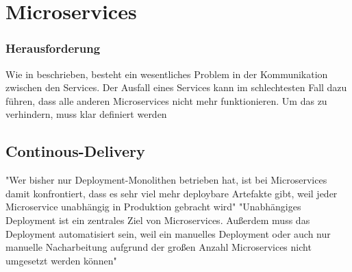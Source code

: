 \chapter{Microservices}
\label{chap:Microservices}


\subsection{Herausforderung}
Wie in \cite[S. 25]{EWolff2016:Microservices} beschrieben, besteht ein wesentliches Problem in der Kommunikation zwischen den Services. Der Ausfall eines Services kann im schlechtesten Fall dazu führen, dass alle anderen Microservices nicht mehr funktionieren. Um das zu verhindern, muss klar definiert werden


\section{Continous-Delivery}
\label{sec:ContinousDelivery}
"Wer bisher nur Deployment-Monolithen betrieben hat, ist bei Microservices damit konfrontiert, dass es sehr viel mehr deploybare Artefakte gibt, weil jeder Microservice unabhängig in Produktion gebracht wird"\cite[S. 241]{EWolff2016:Microservices}
"Unabhängiges Deployment ist ein zentrales Ziel von Microservices. Außerdem muss das Deployment automatisiert sein, weil ein manuelles Deployment oder auch nur manuelle Nacharbeitung aufgrund der großen Anzahl Microservices nicht umgesetzt werden können"\cite[S. 256]{EWolff2016:Microservices}

